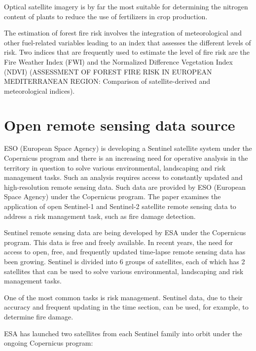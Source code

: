 \begin{example} 
	\label{exa:nitro}
	Optical satellite imagery is by far the most suitable for determining the nitrogen content of plants to reduce the use of fertilizers in crop production.
\end{example}

\begin{example} 
	The estimation of forest fire risk involves the integration of meteorological and other fuel-related variables leading to an index that assesses the different levels of risk. Two indices that are frequently used to estimate the level of fire risk are the Fire Weather Index (FWI) and the Normalized Difference Vegetation Index (NDVI) (ASSESSMENT OF FOREST FIRE RISK IN EUROPEAN MEDITERRANEAN REGION: Comparison of satellite-derived and meteorological indices).
\end{example}	

\section{Open remote sensing data source}

	ESO (European Space Agency) is developing a Sentinel satellite system under the Copernicus program and there is an increasing need for operative analysis in the territory in question to solve various environmental, landscaping and risk management tasks. Such an analysis requires access to constantly updated and high-resolution remote sensing data. Such data are provided by ESO (European Space Agency) under the Copernicus program. The paper examines the application of open Sentinel-1 and Sentinel-2 satellite remote sensing data to address a risk management task, such as fire damage detection.
	
	Sentinel remote sensing data are being developed by ESA under the Copernicus program. This data is free and freely available. In recent years, the need for access to open, free, and frequently updated time-lapse remote sensing data has been growing. Sentinel is divided into 6 groups of satellites, each of which has 2 satellites that can be used to solve various environmental, landscaping and risk management tasks.
	
	One of the most common tasks is risk management. Sentinel data, due to their accuracy and frequent updating in the time section, can be used, for example, to determine fire damage.
	
	ESA has launched two satellites from each Sentinel family into orbit under the ongoing Copernicus program:
	
